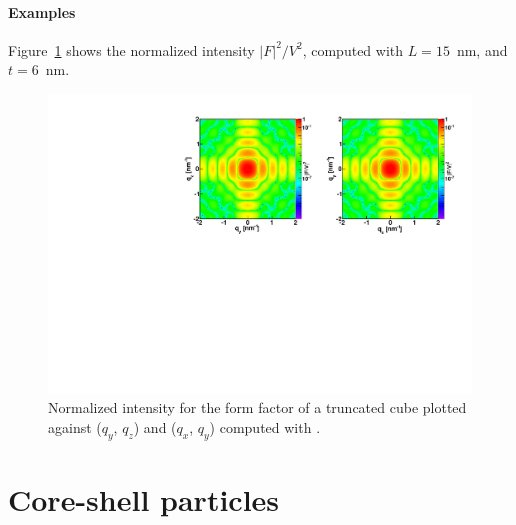 \paragraph{Examples}
Figure~\ref{fig:FFtrunccubeEx} shows the normalized intensity
$|F|^2/V^2$, computed with $L=15$~nm,  and $t=6$~nm.

\begin{figure}[ht]
\begin{center}
\includegraphics[angle=-90,width=\textwidth]{fig/ff/figfftruncatedcube.pdf}
\end{center}
\caption{Normalized intensity for the form factor of a truncated cube plotted against ($q_y$, $q_z$) and  ($q_x$, $q_y$)
  computed with .}
\label{fig:FFtrunccubeEx}
\end{figure}


\newpage
\section{Core-shell particles} \label{sec:CoreShell}

